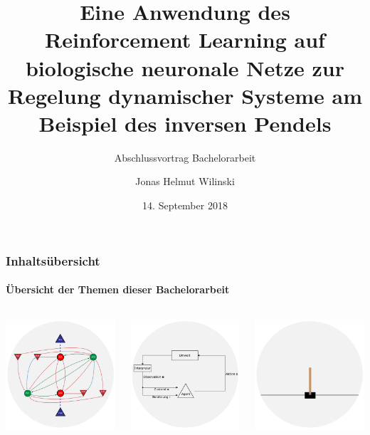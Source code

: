 \documentclass[10pt,t,aspectratio=1610]{beamer}
\title{Eine Anwendung des Reinforcement Learning auf biologische neuronale Netze zur Regelung dynamischer Systeme am Beispiel des inversen Pendels}
\subtitle{Abschlussvortrag Bachelorarbeit}
\author[J. Wilinski]{Jonas Helmut Wilinski}
\institute[ACON]{Abschlussvortrag Bachelorarbeit, Kiel (Germany),}
\date{14. September 2018}
\newcommand{\Inhalt}{Inhaltsübersicht}
\begin{document}

\begin{frame}[plain]
  \titlepage
\end{frame}


\begin{frame}
\frametitle{\Inhalt}
\framesubtitle{Übersicht der Themen dieser Bachelorarbeit}
\vspace{1cm}
\begin{columns}[T,onlytextwidth]
	\begin{column}{0.3\textwidth}
		\centering
		\includegraphics[width=4.5cm]{figures/folie_1/bnn.pdf}
	\end{column}
	\hspace{0.2cm}
	\begin{column}{0.3\textwidth}
		\centering
		\includegraphics[width=4.5cm]{figures/folie_1/rl.pdf}
	\end{column}
	\hspace{0.2cm}
	\begin{column}{0.3\textwidth}
		\centering
		\includegraphics[width=4.5cm]{figures/folie_1/cartpole.pdf}
	\end{column}
\end{columns}

\end{frame}
\end{document}
